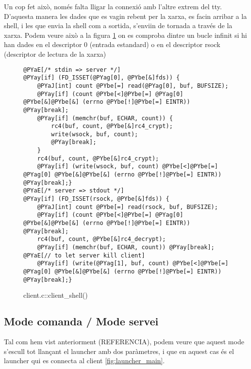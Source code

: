 Un cop fet això, només falta lligar la connexió amb l'altre extrem del tty. D'aquesta manera les dades que es vagin rebent per la xarxa, es facin arribar a la shell, i les que envia la shell com a sortida, s'enviin de tornada a través de la xarxa. Podem veure això a la figura \ref{fig:client_client_shell} on es comproba dintre un bucle infinit si hi han dades en el descriptor 0 (entrada estandard) o en el descriptor rsock (descriptor de lectura de la xarxa)

\begin{figure}[htp]
\begin{Verbatim}[commandchars=@\[\]]
@PYaE[/* stdin => server */]
@PYay[if] (FD_ISSET(@PYag[0], @PYbe[&]fds)) {
    @PYaJ[int] count @PYbe[=] read(@PYag[0], buf, BUFSIZE);
    @PYay[if] (count @PYbe[<]@PYbe[=] @PYag[0] @PYbe[&]@PYbe[&] (errno @PYbe[!]@PYbe[=] EINTR)) @PYay[break];
    @PYay[if] (memchr(buf, ECHAR, count)) {
        rc4(buf, count, @PYbe[&]rc4_crypt);
        write(wsock, buf, count);
        @PYay[break];
    }
    rc4(buf, count, @PYbe[&]rc4_crypt);
    @PYay[if] (write(wsock, buf, count) @PYbe[<]@PYbe[=] @PYag[0] @PYbe[&]@PYbe[&] (errno @PYbe[!]@PYbe[=] EINTR)) @PYay[break];}
@PYaE[/* server => stdout */]
@PYay[if] (FD_ISSET(rsock, @PYbe[&]fds)) {
    @PYaJ[int] count @PYbe[=] read(rsock, buf, BUFSIZE);
    @PYay[if] (count @PYbe[<]@PYbe[=] @PYag[0] @PYbe[&]@PYbe[&] (errno @PYbe[!]@PYbe[=] EINTR)) @PYay[break];
    rc4(buf, count, @PYbe[&]rc4_decrypt);
    @PYay[if] (memchr(buf, ECHAR, count)) @PYay[break]; @PYaE[// to let server kill client]
    @PYay[if] (write(@PYag[1], buf, count) @PYbe[<]@PYbe[=] @PYag[0] @PYbe[&]@PYbe[&] (errno @PYbe[!]@PYbe[=] EINTR)) @PYay[break];}
\end{Verbatim}
\caption{client.c::client\_shell()}
\label{fig:client_client_shell}
\end{figure}

\subsection{Mode comanda / Mode servei}

Tal com hem vist anteriorment (REFERENCIA), podem veure que aquest mode s'escull tot llançant el launcher
amb dos paràmetres, i que en aquest cas és el launcher qui es connecta al client \ref{fig:launcher_main}.

